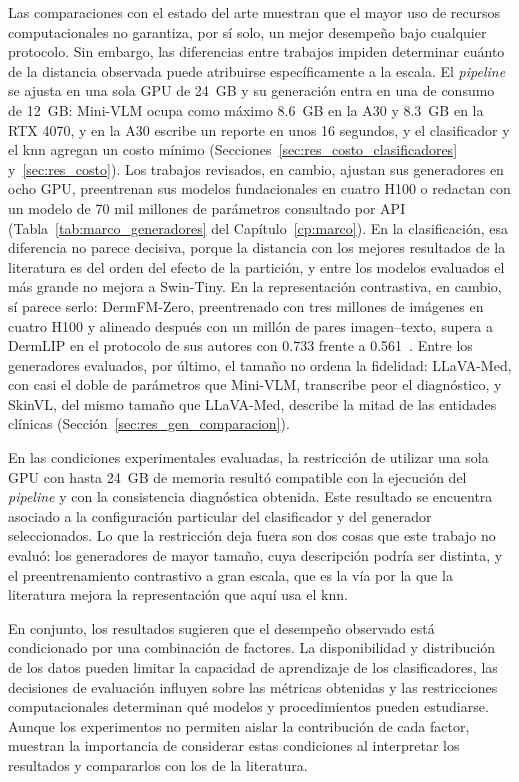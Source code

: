 Las comparaciones con el estado del arte muestran que el mayor uso de recursos computacionales no garantiza, por sí solo, un mejor desempeño bajo cualquier protocolo. Sin embargo, las diferencias entre trabajos impiden determinar cuánto de la distancia observada puede atribuirse específicamente a la escala. El \emph{pipeline} se ajusta en una sola GPU de 24~GB y su generación entra en una de consumo de 12~GB: Mini-VLM ocupa como máximo 8.6~GB en la A30 y 8.3~GB en la RTX 4070, y en la A30 escribe un reporte en unos 16 segundos, y el clasificador y el \gls{knn} agregan un costo mínimo (Secciones~\ref{sec:res_costo_clasificadores}
y~\ref{sec:res_costo}). Los trabajos revisados, en cambio, ajustan sus generadores en ocho GPU, preentrenan sus modelos
fundacionales en cuatro H100 o redactan con un modelo de 70 mil millones de parámetros consultado por
API~\cite{khan2025ensemble} (Tabla~\ref{tab:marco_generadores} del Capítulo~\ref{cp:marco}). En la clasificación, esa
diferencia no parece decisiva, porque la distancia con los mejores resultados de la literatura es del orden del efecto
de la partición, y entre los modelos evaluados el más grande no mejora a Swin-Tiny. En la representación contrastiva, en cambio, sí parece serlo: DermFM-Zero, preentrenado con tres millones de imágenes en cuatro H100 y alineado después con un millón de pares
imagen--texto, supera a DermLIP en el protocolo de
sus autores con 0.733 frente a 0.561~\cite{yan2026dermfmzero}. Entre los generadores evaluados, por último, el tamaño no ordena la
fidelidad: LLaVA-Med, con casi el doble de parámetros que Mini-VLM, transcribe peor el diagnóstico, y SkinVL, del mismo
tamaño que LLaVA-Med, describe la mitad de las entidades clínicas (Sección~\ref{sec:res_gen_comparacion}).

En las condiciones experimentales evaluadas, la restricción de utilizar una sola GPU con hasta 24~GB de memoria resultó compatible con la ejecución del \emph{pipeline} y con la consistencia diagnóstica obtenida. Este resultado se encuentra asociado a la configuración particular del clasificador y del generador seleccionados. Lo que la restricción deja fuera son dos
cosas que este trabajo no evaluó: los generadores de mayor tamaño, cuya descripción podría ser distinta, y el
preentrenamiento contrastivo a gran escala, que es la vía por la que la literatura mejora la representación que aquí
usa el \gls{knn}.

En conjunto, los resultados sugieren que el desempeño observado está condicionado por una combinación de factores. La disponibilidad y distribución de los datos pueden limitar la capacidad de aprendizaje de los clasificadores, las decisiones de evaluación influyen sobre las métricas obtenidas y las restricciones computacionales determinan qué modelos y procedimientos pueden estudiarse. Aunque los experimentos no permiten aislar la contribución de cada factor, muestran la importancia de considerar estas condiciones al interpretar los resultados y compararlos con los de la literatura.
